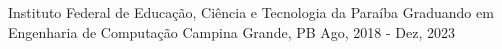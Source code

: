
\begin{cventries}
  \cventry
    {Instituto Federal de Educação, Ciência e Tecnologia da Paraíba} %
    {Graduando em Engenharia de Computação} %
    {Campina Grande, PB} %
    {Ago, 2018 - Dez, 2023} %
    {}
\end{cventries}
